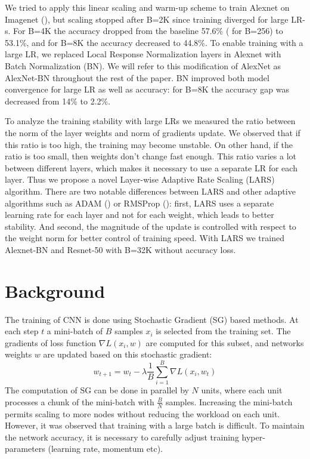 \documentclass{article} %
\begin{document}
We tried to apply this linear scaling and warm-up scheme to train  Alexnet on Imagenet (\cite{deng2009imagenet}), but scaling stopped after B=2K since training diverged for large LR-s. For B=4K the accuracy dropped from the baseline 57.6\% ( for B=256) to 53.1\%, and for B=8K the accuracy decreased to 44.8\%. To enable training with a large LR, we replaced Local Response Normalization layers in Alexnet with Batch Normalization (BN). We will refer to this modification of AlexNet as AlexNet-BN throughout the rest of the paper. BN improved both model convergence for large LR as well as accuracy: for B=8K  the accuracy gap was decreased from 14\% to 2.2\%.

To analyze the training stability with large LRs we measured the ratio between the norm of the layer weights and norm of gradients update. We observed that if this ratio is too high, the training may become unstable. On other hand, if the ratio is too small, then weights don’t change fast enough. This ratio varies a lot between different layers, which makes it necessary to use a separate LR for each layer. Thus we propose a novel Layer-wise Adaptive Rate Scaling (LARS) algorithm. There are two notable differences between LARS and other adaptive algorithms such as ADAM (\cite{kingma2014adam}) or RMSProp  (\cite{tieleman2012lecture}): first, LARS uses a separate learning rate for each layer and not for each weight, which leads to better stability. And second, the magnitude of the update is controlled with respect to the weight norm for better control of training speed. With LARS we trained Alexnet-BN and Resnet-50 with B=32K without accuracy loss.

\section{Background}
\label{sec:background}
The training of CNN is done using Stochastic Gradient (SG) based methods. At each step $t$ a mini-batch of $B$ samples $x_i$ is selected from the training set. The gradients of loss function  $\nabla L(x_i, w)$ are computed for this subset, and  networks weights $w$ are updated based on this stochastic gradient:
\begin{equation}
    w_{t+1} = w_t - \lambda \frac{1}{B} {\sum}_{i=1}^{B} \nabla L(x_i,  w_t)
    \label{eq:update1}
\end{equation}
The computation of SG can be done in parallel by $N$ units, where each unit processes a chunk  of  the mini-batch with $\frac{B}{N}$ samples. Increasing the mini-batch permits scaling to more nodes without reducing the workload on each unit. However, it was observed that training with a large batch is difficult. To maintain the network accuracy, it is necessary to carefully adjust training hyper-parameters (learning rate, momentum etc). 
\end{document}
